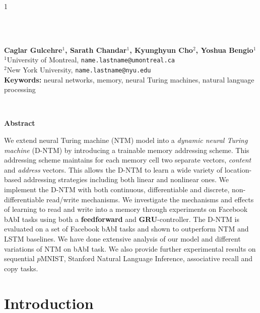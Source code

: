 \documentclass[12pt]{article}
\begin{document}
\hspace{13.9cm}1

\ \vspace{20mm}\\


\ \\
{\bf \large Caglar Gulcehre$^{\displaystyle 1}$, Sarath Chandar$^{\displaystyle 1}$, Kyunghyun Cho$^{\displaystyle 2}$, Yoshua Bengio$^{\displaystyle 1}$}\\
{$^{\displaystyle 1}$University of Montreal, {\small \tt name.lastname@umontreal.ca}}\\
{$^{\displaystyle 2}$New York University, {\small \tt name.lastname@nyu.edu}}\\


{\bf Keywords:} neural networks, memory, neural Turing machines, natural language processing

\thispagestyle{empty}
\ \vspace{-0mm}\\
\begin{center} {\bf Abstract} \end{center}
We extend neural Turing machine (NTM) model into a {\it
    dynamic neural Turing machine} (D-NTM) by introducing a trainable memory
    addressing scheme. This addressing scheme maintains for each memory cell two separate
    vectors, {\it content} and {\it address} vectors. This allows the D-NTM to
    learn a wide variety of location-based addressing strategies including both
    linear and nonlinear ones. We implement the D-NTM with both continuous,
    differentiable and discrete, non-differentiable read/write mechanisms. We investigate
    the mechanisms and effects of learning to read and  write into a memory through experiments 
    on Facebook bAbI tasks using both a {\bf feedforward} and {\bf GRU}-controller. The D-NTM
    is evaluated on a set of Facebook bAbI tasks and shown to outperform NTM and LSTM baselines.
    We have done extensive analysis of our model and different variations of NTM on bAbI task.
    We also provide further experimental results on sequential $p$MNIST, Stanford Natural 
    Language Inference, associative recall and copy tasks.


\section{Introduction}
\end{document}
